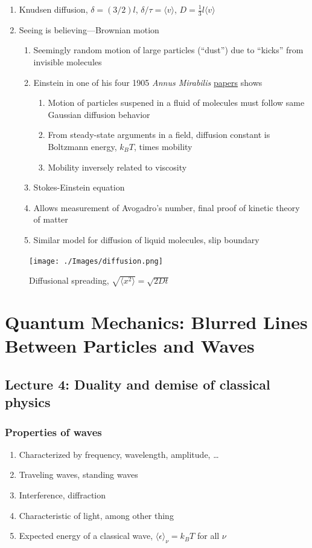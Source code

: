 \documentclass[11pt]{article}
\begin{document}
\begin{enumerate}
\begin{enumerate}
\end{enumerate}
\item Knudsen diffusion, \(\delta = (3/2)l\), \(\delta/\tau = \langle v \rangle\), \(D=\frac{1}{3}l \langle v \rangle\)
\item Seeing is believing---Brownian motion
\begin{enumerate}
\item Seemingly random motion of large particles (``dust'') due to ``kicks'' from invisible molecules
\item Einstein in one of his four 1905 \emph{Annus Mirabilis} \href{https://einsteinpapers.press.princeton.edu/vol2-trans/137}{papers} shows
\begin{enumerate}
\item Motion of particles suspened in a fluid of molecules must
follow same Gaussian diffusion behavior
\item From steady-state arguments in a field, diffusion constant is Boltzmann energy, \(k_B T\), times mobility
\item Mobility inversely related to viscosity
\end{enumerate}
\item Stokes-Einstein equation
\item Allows measurement of Avogadro's number, final proof of kinetic theory of matter
\item Similar model for diffusion of liquid molecules, slip boundary
\end{enumerate}
\end{enumerate}

\begin{figure}[htbp]
\centering
\texttt{[image: ./Images/diffusion.png]}
\caption{Diffusional spreading, \(\sqrt{\langle x^2 \rangle} = \sqrt{2 D t}\)}
\end{figure}

\section{Quantum Mechanics: Blurred Lines Between Particles and Waves}
\label{sec:org4b06210}
\subsection{Lecture 4: Duality and demise of classical physics}
\label{sec:org6937856}
\subsubsection{Properties of waves}
\label{sec:orga911bf1}
\begin{enumerate}
\item Characterized by frequency, wavelength, amplitude, \ldots
\item Traveling waves, standing waves
\item Interference, diffraction
\item Characteristic of light, among other thing
\item Expected energy of a classical wave, \(\langle \epsilon \rangle _\nu = k_B T\) for all \(\nu\)
\end{enumerate}
\end{document}
